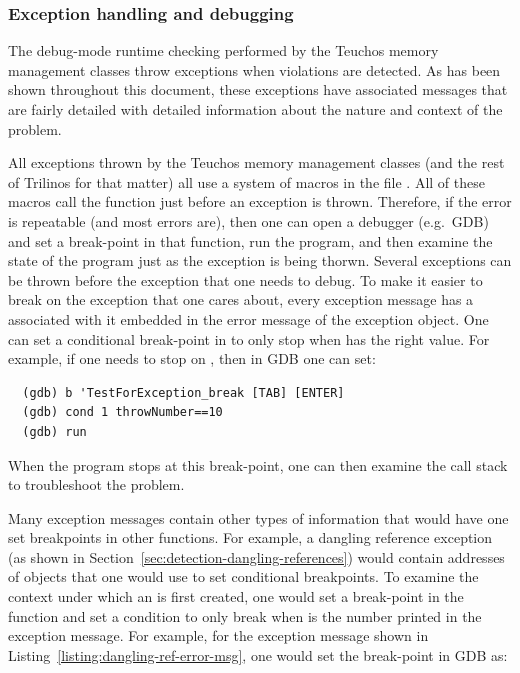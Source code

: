 \documentclass[pdf,ps2pdf,11pt]{SANDreport}
\begin{document}
%
{}\subsubsection{Exception handling and debugging}
\label{sec:except-handling-debugging}
%

The debug-mode runtime checking performed by the Teuchos memory
management classes throw exceptions when violations are detected.  As
has been shown throughout this document, these exceptions have
associated messages that are fairly detailed with detailed information
about the nature and context of the problem.

All exceptions thrown by the Teuchos memory management classes (and
the rest of Trilinos for that matter) all use a system of macros in
the file {}.  All of these macros
call the function {} just before an
exception is thrown.  Therefore, if the error is repeatable (and most
errors are), then one can open a debugger (e.g.\ GDB) and set a
break-point in that function, run the program, and then examine the
state of the program just as the exception is being thorwn.  Several
exceptions can be thrown before the exception that one needs to debug.
To make it easier to break on the exception that one cares about,
every exception message has a {} associated with it
embedded in the error message of the exception object.  One can set a
conditional break-point in {} to
only stop when {} has the right value.  For example,
if one needs to stop on {}, then in GDB one can
set:

{\small\begin{verbatim}
  (gdb) b 'TestForException_break [TAB] [ENTER]
  (gdb) cond 1 throwNumber==10
  (gdb) run
\end{verbatim}}

When the program stops at this break-point, one can then examine the
call stack to troubleshoot the problem.

Many exception messages contain other types of information that would
have one set breakpoints in other functions.  For example, a dangling
reference exception (as shown in
Section~\ref{sec:detection-dangling-references}) would contain
addresses of objects that one would use to set conditional
breakpoints.  To examine the context under which an {} is
first created, one would set a break-point in the function
{} and set a condition
to only break when {} is the number printed in
the exception message.  For example, for the exception message shown
in Listing~\ref{listing:dangling-ref-error-msg}, one would set the
break-point in GDB as:
\end{document}
